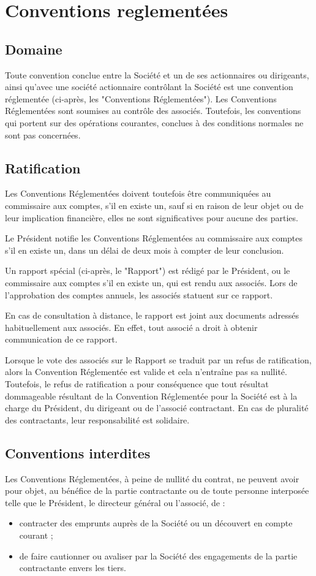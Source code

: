 \documentclass[a4paper,12pt]{report}
\begin{document}
\section{Conventions reglementées}
\subsection{Domaine}
Toute convention conclue entre la Société et un de ses actionnaires ou dirigeants, ainsi qu'avec une société actionnaire contrôlant la Société est une convention réglementée (ci-après, les "Conventions Réglementées"). Les Conventions Réglementées sont soumises au contrôle des associés. Toutefois, les conventions qui portent sur des opérations courantes, conclues à des conditions normales ne sont pas concernées.

\subsection{Ratification}
Les Conventions Réglementées doivent toutefois être communiquées au commissaire aux comptes, s'il en existe un, sauf si en raison de leur objet ou de leur implication financière, elles ne sont significatives pour aucune des parties.

Le Président notifie les Conventions Réglementées au commissaire aux comptes s'il en existe un, dans un délai de deux mois à compter de leur conclusion.

Un rapport spécial (ci-après, le "Rapport") est rédigé par le Président, ou le commissaire aux comptes s'il en existe un, qui est rendu aux associés. Lors de l'approbation des comptes annuels, les associés statuent sur ce rapport.

En cas de consultation à distance, le rapport est joint aux documents adressés habituellement aux associés. En effet, tout associé a droit à obtenir communication de ce rapport.

Lorsque le vote des associés sur le Rapport se traduit par un refus de ratification, alors la Convention Réglementée est valide et cela n'entraîne pas sa nullité. Toutefois, le refus de ratification a pour conséquence que tout résultat dommageable résultant de la Convention Réglementée pour la Société est à la charge du Président, du dirigeant ou de l'associé contractant. En cas de pluralité des contractants, leur responsabilité est solidaire.

\subsection{Conventions interdites}
Les Conventions Réglementées, à peine de nullité du contrat, ne peuvent avoir pour objet, au bénéfice de la partie contractante ou de toute personne interposée telle que le Président, le directeur général ou l'associé, de :
\begin{itemize}
	\item contracter des emprunts auprès de la Société ou un découvert en compte courant ;
	\item de faire cautionner ou avaliser par la Société des engagements de la partie contractante envers les tiers.
\end{itemize}
\end{document}
